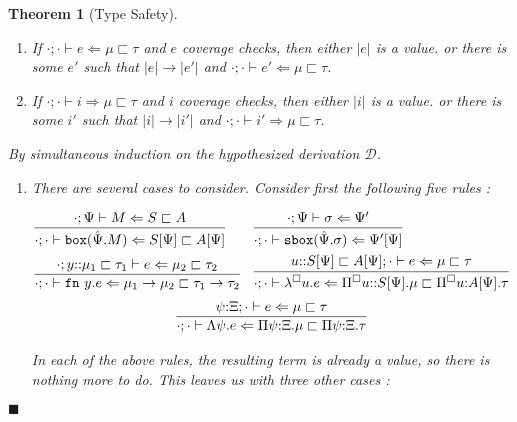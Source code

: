 \documentclass[letterpaper, 11pt]{article}
\newtheorem*{theorem}{Theorem}[section]
\newenvironment*{proof}{\par\noindent{\normalfont{\bf{Proof. \\ \hphantom{mm}
}}}}{\hfill \small$\blacksquare$\\[-4pt]}
\newcommand{\D}{\mathcal{D}}
\newcommand{\Rar}{\Rightarrow}
\newcommand{\Lar}{\Leftarrow}
\newcommand{\rar}{\rightarrow}
\newcommand{\fn}{\texttt{fn}}
\newcommand{\bbox}{\texttt{box}}
\newcommand{\sbbox}{\texttt{sbox}}
\begin{document}
    \begin{theorem}[Type Safety]
      \leavevmode
      \begin{enumerate}
        \item If $\cdot; \cdot \vdash e \Lar \mu \sqsubset \tau$ and $e$ coverage checks, then either $|e|$ is a value. or there is some $e'$ such that 
          $|e| \rar |e'|$ and $\cdot ; \cdot \vdash e' \Lar \mu \sqsubset \tau$.

        \item If $\cdot; \cdot \vdash i \Rar \mu \sqsubset \tau$ and $i$ coverage checks, then either $|i|$ is a value. or there is some $i'$ such that 
          $|i| \rar |i'|$ and $\cdot ; \cdot \vdash i' \Rar \mu \sqsubset \tau$.
      \end{enumerate}
      
      \begin{proof}
        By simultaneous induction on the hypothesized derivation $\D$.
        \begin{enumerate}
          \item There are several cases to consider.  Consider first the following five rules :
            
            \begin{align*}
              & \infer{\cdot; \cdot \vdash \bbox(\hat{\Psi}.M) \Lar S[\Psi] \sqsubset A[\Psi]}
                      {\cdot; \Psi \vdash M \Lar S \sqsubset A} &
              & \infer{\cdot ; \cdot \vdash \sbbox(\hat{\Psi}. \sigma) \Lar \Psi'[\Psi]}
                        {\cdot; \Psi \vdash \sigma \Lar \Psi'} \\
              & \infer{\cdot ; \cdot \vdash \fn \ y.e \Lar \mu_1 \rar \mu_2 \sqsubset \tau_1 \rar \tau_2}
                      { \cdot; y{::}\mu_1 \sqsubset \tau_1 \vdash e \Lar \mu_2 \sqsubset \tau_2} &
              & \infer{\cdot; \cdot \vdash \lambda^\square u.e \Lar \Pi^\square u{::}S[\Psi]. \mu \sqsubset \Pi^\square u{:}A[\Psi].\tau}
                      {u{::}S[\Psi] \sqsubset A[\Psi] ; \cdot \vdash e \Lar \mu \sqsubset \tau}
            \end{align*}
            \begin{align*}
              \infer{\cdot; \cdot \vdash \Lambda \psi. e \Lar \Pi \psi{:} \Xi. \mu \sqsubset \Pi \psi{:}\Xi. \tau}
                    {\psi {:} \Xi ; \cdot \vdash e \Lar \mu \sqsubset \tau}
            \end{align*}
            
            In each of the above rules, the resulting term is already a value, so there is nothing more to do.  This leaves us with three other cases :


\end{enumerate}
\end{proof}
\end{theorem}
\end{document}
